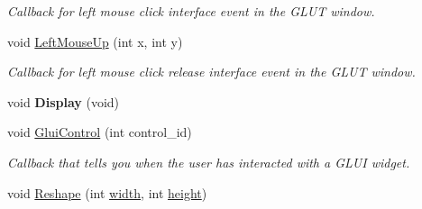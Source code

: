 \begin{DoxyCompactItemize}
\begin{DoxyCompactList}\small\item\em Callback for left mouse click interface event in the G\+L\+UT window. \end{DoxyCompactList}\item 
void \hyperlink{classimage__tools_1_1FlashPhotoApp_ab2fb593952915731ec50da0a4a20d097}{Left\+Mouse\+Up} (int x, int y)\hypertarget{classimage__tools_1_1FlashPhotoApp_ab2fb593952915731ec50da0a4a20d097}{}\label{classimage__tools_1_1FlashPhotoApp_ab2fb593952915731ec50da0a4a20d097}

\begin{DoxyCompactList}\small\item\em Callback for left mouse click release interface event in the G\+L\+UT window. \end{DoxyCompactList}\item 
void {\bfseries Display} (void)\hypertarget{classimage__tools_1_1FlashPhotoApp_a3ee0b08c0e7096652ef8dc549a684f76}{}\label{classimage__tools_1_1FlashPhotoApp_a3ee0b08c0e7096652ef8dc549a684f76}

\item 
void \hyperlink{classimage__tools_1_1FlashPhotoApp_a1cfe5fd1baf32a23264a6eff88987baf}{Glui\+Control} (int control\+\_\+id)\hypertarget{classimage__tools_1_1FlashPhotoApp_a1cfe5fd1baf32a23264a6eff88987baf}{}\label{classimage__tools_1_1FlashPhotoApp_a1cfe5fd1baf32a23264a6eff88987baf}

\begin{DoxyCompactList}\small\item\em Callback that tells you when the user has interacted with a G\+L\+UI widget. \end{DoxyCompactList}\item 
void \hyperlink{classimage__tools_1_1FlashPhotoApp_a1f1e89e2d771eb2614f1f3f46a8cb01d}{Reshape} (int \hyperlink{classimage__tools_1_1BaseGfxApp_a2fe403c5392f624477c2ce4429f1a7b5}{width}, int \hyperlink{classimage__tools_1_1BaseGfxApp_aa961e13a7a8e6062204223cc33ac7503}{height})\hypertarget{classimage__tools_1_1FlashPhotoApp_a1f1e89e2d771eb2614f1f3f46a8cb01d}{}\label{classimage__tools_1_1FlashPhotoApp_a1f1e89e2d771eb2614f1f3f46a8cb01d}


\end{DoxyCompactItemize}
